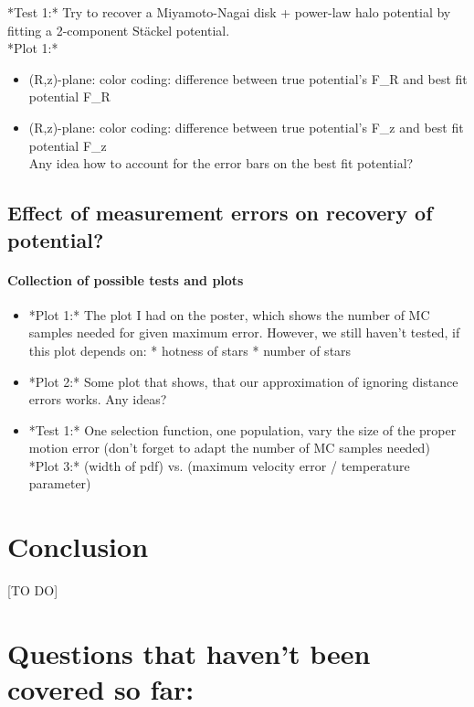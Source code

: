 \documentclass[12pt,preprint]{aastex}
\begin{document}
*Test 1:* Try to recover a Miyamoto-Nagai disk + power-law halo potential by fitting a 2-component St\"ackel potential. \\
*Plot 1:* 
\begin{itemize}
   \item (R,z)-plane: color coding: difference between true potential's F\_R and best fit potential F\_R
    \item (R,z)-plane: color coding: difference between true potential's F\_z and best fit potential F\_z \\
    Any idea how to account for the error bars on the best fit potential?
\end{itemize}

\subsection{Effect of measurement errors on recovery of potential?}

\paragraph{Collection of possible tests and plots}

\begin{itemize}
\item *Plot 1:* The plot I had on the poster, which shows the number of MC samples needed for given maximum error. However, we still haven't tested, if this plot depends on: 
    * hotness of stars
    * number of stars
\item *Plot 2:* Some plot that shows, that our approximation of ignoring distance errors works. Any ideas?
\item *Test 1:* One selection function, one population, vary the size of the proper motion error (don't forget to adapt the number of MC samples needed) \\
*Plot 3:* (width of pdf) vs. (maximum velocity error / temperature parameter)
\end{itemize}



\section{Conclusion}

[TO DO]

\section{Questions that haven't been covered so far:}
\end{document}

